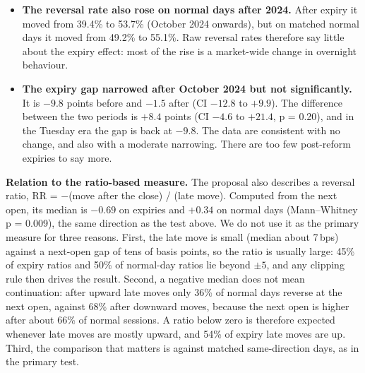 \documentclass[10pt,a4paper]{article}
\newcommand{\bps}{\,bps\xspace}
\begin{document}
\begin{itemize}
\item \textbf{The reversal rate also rose on normal days after 2024.} After expiry it moved from 39.4\% to 53.7\% (October 2024 onwards), but on matched normal days it moved from 49.2\% to 55.1\%. Raw reversal rates therefore say little about the expiry effect: most of the rise is a market-wide change in overnight behaviour.
\item \textbf{The expiry gap narrowed after October 2024 but not significantly.} It is $-9.8$ points before and $-1.5$ after (CI $-12.8$ to $+9.9$). The difference between the two periods is $+8.4$ points (CI $-4.6$ to $+21.4$, p = 0.20), and in the Tuesday era the gap is back at $-9.8$. The data are consistent with no change, and also with a moderate narrowing. There are too few post-reform expiries to say more.
\end{itemize}

\textbf{Relation to the ratio-based measure.} The proposal also describes a reversal ratio, RR = $-$(move after the close) / (late move). Computed from the next open, its median is $-0.69$ on expiries and $+0.34$ on normal days (Mann--Whitney p = 0.009), the same direction as the test above. We do not use it as the primary measure for three reasons. First, the late move is small (median about 7\bps) against a next-open gap of tens of basis points, so the ratio is usually large: 45\% of expiry ratios and 50\% of normal-day ratios lie beyond $\pm5$, and any clipping rule then drives the result. Second, a negative median does not mean continuation: after upward late moves only 36\% of normal days reverse at the next open, against 68\% after downward moves, because the next open is higher after about 66\% of normal sessions. A ratio below zero is therefore expected whenever late moves are mostly upward, and 54\% of expiry late moves are up. Third, the comparison that matters is against matched same-direction days, as in the primary test.
\end{document}
